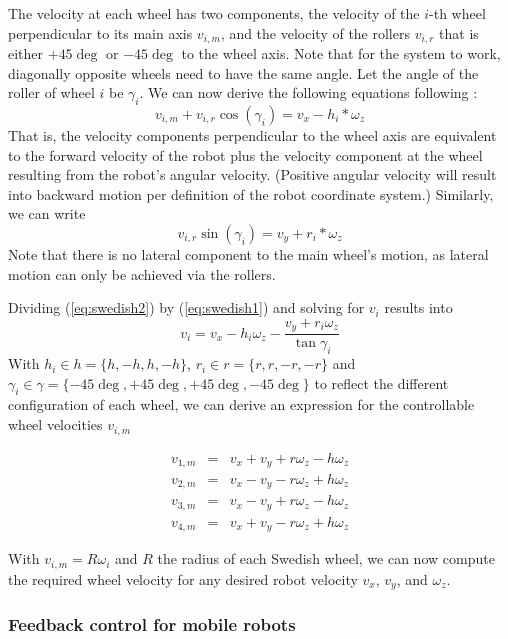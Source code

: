 The velocity at each wheel has two components, the velocity of the $i$-th wheel perpendicular to its main axis $v_{i,m}$, and the velocity of the rollers $v_{i,r}$ that is either $+45\deg$ or $-45\deg$ to the wheel axis. Note that for the system to work, diagonally opposite wheels need to have the same angle. Let the angle of the roller of wheel $i$ be $\gamma_i$. We can now derive the following equations following \cite{maulana2015inverse}:
\begin{equation}\label{eq:swedish1}
v_{i,m}+v_{i,r}\cos(\gamma_i) = v_x - h_i*\omega_z
\end{equation}
That is, the velocity components perpendicular to the wheel axis are equivalent to the forward velocity of the robot plus the velocity component at the wheel resulting from the robot's angular velocity. (Positive angular velocity will result into backward motion per definition of the robot coordinate system.) Similarly, we can write
\begin{equation}\label{eq:swedish2}
v_{i,r}\sin(\gamma_i) = v_y+r_i*\omega_z
\end{equation}
Note that there is no lateral component to the main wheel's motion, as lateral motion can only be achieved via the rollers.

Dividing (\ref{eq:swedish2}) by (\ref{eq:swedish1}) and solving for $v_i$ results into
\begin{equation}
v_i=v_x-h_i\omega_z-\frac{v_y+r_i\omega_z}{\tan{\gamma_i}}
\end{equation}
With $h_i \in h =\{h,-h,h,-h\}$, $r_i \in r=\{r,r,-r,-r\}$ and
$\gamma_i \in \gamma=\{-45\deg,+45\deg,+45\deg,-45\deg\}$ to reflect the different configuration of each wheel, we can derive an expression for the controllable wheel velocities $v_{i,m}$

\begin{eqnarray}
v_{1,m} &=& v_x+v_y+r\omega_z-h\omega_z \\
v_{2,m} &=& v_x-v_y-r\omega_z+h\omega_z \nonumber\\
v_{3,m} &=& v_x-v_y+r\omega_z-h\omega_z \nonumber\\
v_{4,m} &=& v_x+v_y-r\omega_z+h\omega_z \nonumber
\end{eqnarray}

With $v_{i,m}=R\omega_i$ and $R$ the radius of each Swedish wheel, we can now compute the required wheel velocity for any desired robot velocity $v_x$, $v_y$, and $\omega_z$.

\subsubsection{Feedback control for mobile robots}\label{sec:fbmobile}

